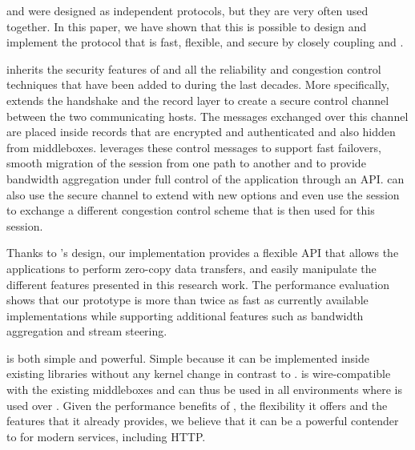 \tcp and \tls were designed as independent protocols, but they are very often
used together. In this paper, we have shown that this is possible to design and
implement the \tcpls protocol that is fast, flexible, and secure by closely
coupling \tcp and \tls.

\tcpls inherits the security features of  and all the reliability and
congestion control techniques that have been added to \tcp during the last
decades. More specifically, \tcpls extends the  handshake and the record
layer to create a secure control channel between the two communicating hosts.
The messages exchanged over this channel are placed inside \tls records that are
encrypted and authenticated and also hidden from middleboxes. \tcpls leverages
these control messages to support fast failovers, smooth
migration of the \tcpls session from one path to another and to provide
bandwidth aggregation under full control of the application through an API. 
\tcpls can also use the secure channel to extend \tcp with new options and even
use the \tcpls session to exchange a different congestion control scheme that
is then used for this session.

Thanks to \tcpls's design, our \tcpls implementation provides a
flexible API that allows the applications to perform zero-copy data transfers,
and easily manipulate the different features presented in this research work.
The performance evaluation shows that our prototype is more than twice as fast
as currently available \quic implementations while supporting additional
features such as bandwidth aggregation and stream steering.

\tcpls is both simple and powerful. Simple because it can be implemented inside
existing \tls libraries without any kernel change in contrast to \mptcp. \tcpls 
is
wire-compatible with the existing \tcp middleboxes and can thus be used in all
environments where  is used over \tcp. Given the performance benefits of
\tcpls, the flexibility it offers and the features that it already provides, we
believe that it can be a powerful contender to \quic for modern services, 
including HTTP.

